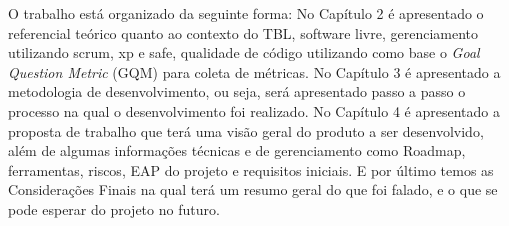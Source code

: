 O trabalho está organizado da seguinte forma: No Capítulo 2 é apresentado o referencial teórico quanto ao contexto do TBL, software livre, gerenciamento utilizando scrum, xp e safe, qualidade de código utilizando como base o \textit{Goal Question Metric} (GQM) para coleta de métricas. No Capítulo 3 é apresentado a metodologia de desenvolvimento, ou seja, será apresentado passo a passo o processo na qual o desenvolvimento foi realizado. No Capítulo 4 é apresentado a proposta de trabalho que terá uma visão geral do produto a ser desenvolvido, além de algumas informações técnicas e de gerenciamento como Roadmap, ferramentas, riscos, EAP do projeto e requisitos iniciais. E por último temos as Considerações Finais na qual terá um resumo geral do que foi falado, e o que se pode esperar do projeto no futuro.
